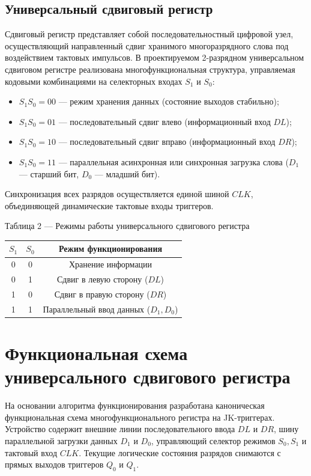 \documentclass[oneside,a4paper,14pt]{extarticle}
\begin{document}
\subsection{Универсальный сдвиговый регистр}
Сдвиговый регистр представляет собой последовательностный цифровой узел, осуществляющий направленный сдвиг хранимого многоразрядного слова под воздействием тактовых импульсов. В проектируемом 2-разрядном универсальном сдвиговом регистре реализована многофункциональная структура, управляемая кодовыми комбинациями на селекторных входах $S_1$ и $S_0$:
\begin{itemize}
  \item $S_1S_0 = 00$ --- режим хранения данных (состояние выходов стабильно);
  \item $S_1S_0 = 01$ --- последовательный сдвиг влево (информационный вход $DL$);
  \item $S_1S_0 = 10$ --- последовательный сдвиг вправо (информационный вход $DR$);
  \item $S_1S_0 = 11$ --- параллельная асинхронная или синхронная загрузка слова ($D_1$ --- старший бит, $D_0$ --- младший бит).
\end{itemize}
Синхронизация всех разрядов осуществляется единой шиной $CLK$, объединяющей динамические тактовые входы триггеров.

\begin{center}
  Таблица 2 --- Режимы работы универсального сдвигового регистра \\
  \vspace{3mm}
  \begin{tabular}{|c|c|c|}
    \hline
    $S_1$ & $S_0$ & Режим функционирования \\
    \hline
    0 & 0 & Хранение информации \\
    0 & 1 & Сдвиг в левую сторону ($DL$) \\
    1 & 0 & Сдвиг в правую сторону ($DR$) \\
    1 & 1 & Параллельный ввод данных ($D_1, D_0$) \\
    \hline
  \end{tabular}
\end{center}

\section{Функциональная схема универсального сдвигового регистра}
На основании алгоритма функционирования разработана каноническая функциональная схема многофункционального регистра на JK-триггерах. Устройство содержит внешние линии последовательного ввода $DL$ и $DR$, шину параллельной загрузки данных $D_1$ и $D_0$, управляющий селектор режимов $S_0, S_1$ и тактовый вход $CLK$. Текущие логические состояния разрядов снимаются с прямых выходов триггеров $Q_0$ и $Q_1$.
\end{document}
